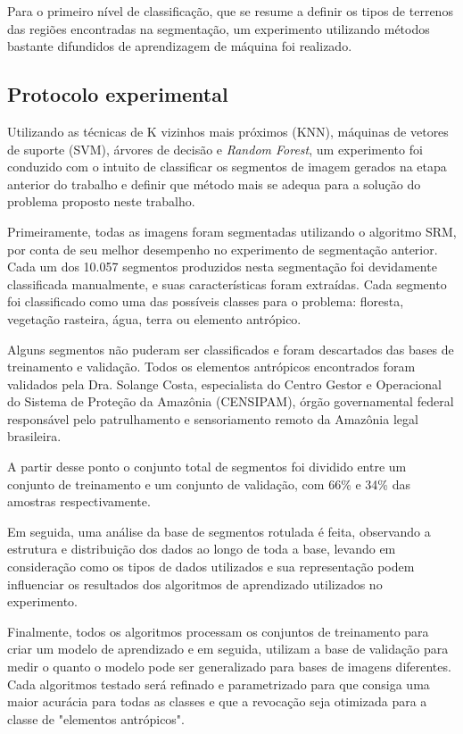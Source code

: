 Para o primeiro nível de classificação, que se resume a definir os tipos de terrenos das regiões encontradas na segmentação, um experimento utilizando métodos bastante difundidos de aprendizagem de máquina foi realizado.

\subsection{Protocolo experimental}

Utilizando as técnicas de K vizinhos mais próximos (KNN), máquinas de vetores de suporte (SVM), árvores de decisão e \textit{Random Forest}, um experimento foi conduzido com o intuito de classificar os segmentos de imagem gerados na etapa anterior do trabalho e definir que método mais se adequa para a solução do problema proposto neste trabalho.

Primeiramente, todas as imagens foram segmentadas utilizando o algoritmo SRM, por conta de seu melhor desempenho no experimento de segmentação anterior. Cada um dos 10.057 segmentos produzidos nesta segmentação foi devidamente classificada manualmente, e suas características foram extraídas. Cada segmento foi classificado como uma das possíveis classes para o problema: floresta, vegetação rasteira, água, terra ou elemento antrópico.

Alguns segmentos não puderam ser classificados e foram descartados das bases de treinamento e validação. Todos os elementos antrópicos encontrados foram validados pela Dra. Solange Costa, especialista do Centro Gestor e Operacional do Sistema de Proteção da Amazônia (CENSIPAM), órgão governamental federal responsável pelo patrulhamento e sensoriamento remoto da Amazônia legal brasileira.

A partir desse ponto o conjunto total de segmentos foi dividido entre um conjunto de treinamento e um conjunto de validação, com 66\% e 34\% das amostras respectivamente.

Em seguida, uma análise da base de segmentos rotulada é feita, observando a estrutura e distribuição dos dados ao longo de toda a base, levando em consideração como os tipos de dados utilizados e sua representação podem influenciar os resultados dos algoritmos de aprendizado utilizados no experimento.

Finalmente, todos os algoritmos processam os conjuntos de treinamento para criar um modelo de aprendizado e em seguida, utilizam a base de validação para medir o quanto o modelo pode ser generalizado para bases de imagens diferentes. Cada algoritmos testado será refinado e parametrizado para que consiga uma maior acurácia para todas as classes e que a revocação seja otimizada para a classe de "elementos antrópicos".

